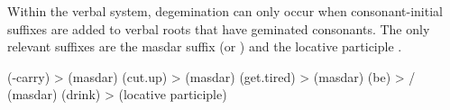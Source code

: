 Within the verbal system, degemination can only occur when consonant-initial suffixes are added to verbal roots that have geminated consonants. The only relevant suffixes are the masdar suffix  (or ) and the locative participle .
%
\begin{exe}
	\ex	\label{ex:degemination masdar locative phon}
	\begin{xlist}
		\ex	{} (-carry) >  (masdar)
		\ex	{} (cut.up) >  (masdar)
		\ex	{} (get.tired) >  (masdar)
		\ex	{} (be) > \slash{} (masdar)
		\ex	{} (drink) >  (locative participle)
	\end{xlist}
\end{exe}
